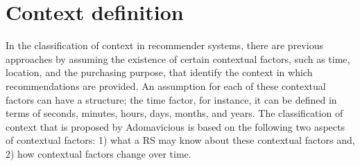 \section{Context definition}

In the classification of context in recommender systems, there are
previous approaches by assuming the existence of certain contextual
factors, such as time, location, and the purchasing purpose, that
identify the context in which recommendations are provided. An
assumption for each of these contextual factors can have a structure;
the time factor, for instance, it can be defined in terms of seconds,
minutes, hours, days, months, and years. The classification of context
that is proposed by Adomavicious\cite{adomavicius2011context} is based on the
following two aspects of contextual factors: 1) what a RS may know
about these contextual factors and, 2) how contextual factors change
over time.
